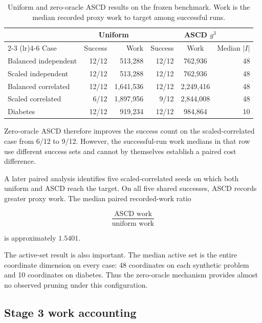 \documentclass[11pt]{article}
\begin{document}
\begin{table}[!htbp]
\centering
\caption{
Uniform and zero-oracle ASCD results on the frozen benchmark.
Work is the median recorded proxy work to target among successful runs.
}
\label{tab:stage3-results}
\small
\begin{tabular}{lrrrcr}
\toprule
& \multicolumn{2}{c}{Uniform}
& \multicolumn{3}{c}{ASCD $g^3$} \\
\cmidrule(lr){2-3}
\cmidrule(lr){4-6}
Case
& Success
& Work
& Success
& Work
& Median $|I|$ \\
\midrule
Balanced independent
& 12/12 & 513,288
& 12/12 & 762,936
& 48 \\

Scaled independent
& 12/12 & 513,288
& 12/12 & 762,936
& 48 \\

Balanced correlated
& 12/12 & 1,641,536
& 12/12 & 2,249,416
& 48 \\

Scaled correlated
& 6/12 & 1,897,956
& 9/12 & 2,844,008
& 48 \\

Diabetes
& 12/12 & 919,234
& 12/12 & 984,864
& 10 \\
\bottomrule
\end{tabular}
\end{table}

Zero-oracle ASCD therefore improves the success count on the
scaled-correlated case from 6/12 to 9/12. However, the successful-run
work medians in that row use different success sets and cannot by
themselves establish a paired cost difference.

A later paired analysis identifies five scaled-correlated seeds on which
both uniform and ASCD reach the target. On all five shared successes,
ASCD records greater proxy work. The median paired recorded-work ratio

\[
\frac{\text{ASCD work}}{\text{uniform work}}
\]

is approximately $1.5401$.

The active-set result is also important. The median active set is the
entire coordinate dimension on every case: 48 coordinates on each
synthetic problem and 10 coordinates on diabetes. Thus the zero-oracle
mechanism provides almost no observed pruning under this configuration.


\subsection{Stage 3 work accounting}
\end{document}
